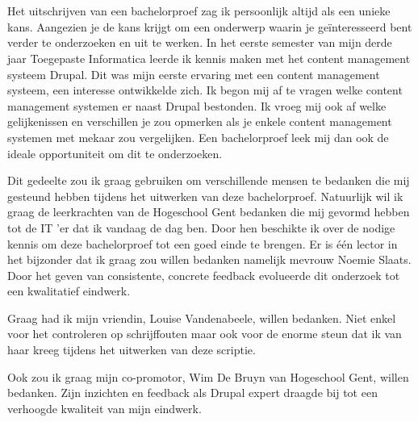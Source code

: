 
\chapter*{}
\label{ch:voorwoord}

Het uitschrijven van een bachelorproef zag ik persoonlijk altijd als een unieke kans. Aangezien je de kans krijgt om een onderwerp waarin je geïnteresseerd bent verder te onderzoeken en uit te werken. In het eerste semester van mijn derde jaar Toegepaste Informatica leerde ik kennis maken met het content management systeem Drupal. Dit was mijn eerste ervaring met een content management systeem, een interesse ontwikkelde zich. Ik begon mij af te vragen welke content management systemen er naast Drupal bestonden. Ik vroeg mij ook af welke gelijkenissen en verschillen je zou opmerken als je enkele content management systemen met mekaar zou vergelijken. Een bachelorproef leek mij dan ook de ideale opportuniteit om dit te onderzoeken.

Dit gedeelte zou ik graag gebruiken om verschillende mensen te bedanken die mij gesteund hebben tijdens het uitwerken van deze bachelorproef. Natuurlijk wil ik graag de leerkrachten van de Hogeschool Gent bedanken die mij gevormd hebben tot de IT 'er dat ik vandaag de dag ben. Door hen beschikte ik over de nodige kennis om deze bachelorproef tot een goed einde te brengen. Er is één lector in het bijzonder dat ik graag zou willen bedanken namelijk mevrouw Noemie Slaats. Door het geven van consistente, concrete feedback evolueerde dit onderzoek tot een kwalitatief eindwerk.

Graag had ik mijn vriendin, Louise Vandenabeele, willen bedanken. Niet enkel voor het controleren op schrijffouten maar ook voor de enorme steun dat ik van haar kreeg tijdens het uitwerken van deze scriptie.

Ook zou ik graag mijn co-promotor, Wim De Bruyn van Hogeschool Gent, willen bedanken. Zijn inzichten en feedback als Drupal expert draagde bij tot een verhoogde kwaliteit van mijn eindwerk.

